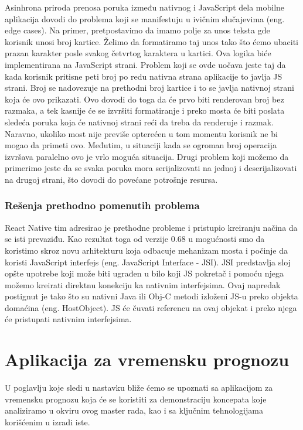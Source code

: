 \documentclass[12pt,oneside]{memoir}
\begin{document}
Asinhrona priroda prenosa poruka između nativnog i JavaScript dela mobilne aplikacija dovodi do problema koji se manifestuju u ivičnim slučajevima (eng. edge cases). Na primer, pretpostavimo da imamo polje za unos teksta gde korisnik unosi broj kartice. Želimo da formatiramo taj unos tako što ćemo ubaciti prazan karakter posle svakog četvrtog karaktera u kartici. Ova logika biće implementirana na JavaScript strani. Problem koji se ovde uočava jeste taj da kada korisnik pritisne peti broj po redu nativna strana aplikacije to javlja JS strani. Broj se nadovezuje na prethodni broj kartice i to se javlja nativnoj strani koja će ovo prikazati. Ovo dovodi do toga da će prvo biti renderovan broj bez razmaka, a tek kasnije će se izvršiti formatiranje i preko mosta će biti poslata sledeća poruka koja će nativnoj strani reći da treba da renderuje i razmak. Naravno, ukoliko most nije previše opterećen u tom momentu korisnik ne bi mogao da primeti ovo. Međutim, u situaciji kada se ogroman broj operacija izvršava paralelno ovo je vrlo moguća situacija. Drugi problem koji možemo da primerimo jeste da se svaka poruka mora serijalizovati na jednoj i deserijalizovati na drugoj strani, što dovodi do povećane potrošnje resursa.

\subsection{Rešenja prethodno pomenutih problema}

React Native tim adresirao je prethodne probleme i pristupio kreiranju načina da se isti prevaziđu. Kao rezultat toga od verzije 0.68 u mogućnosti smo da koristimo skroz novu arhitekturu koja odbacuje mehanizam mosta i počinje da koristi JavaScript interfejs (eng. JavaScript Interface - JSI). JSI predstavlja sloj opšte upotrebe koji može biti ugrađen u bilo koji JS pokretač i pomoću njega možemo kreirati direktnu konekciju ka nativnim interfejsima. Ovaj napredak postignut je tako što su nativni Java ili Obj-C metodi izloženi JS-u preko objekta domaćina (eng. HostObject). JS će čuvati referencu na ovaj objekat i preko njega će pristupati nativnim interfejsima.

\chapter{Aplikacija za vremensku prognozu}

U poglavlju koje sledi u nastavku bliže ćemo se upoznati sa aplikacijom za vremensku prognozu koja će se koristiti za demonstraciju koncepata koje analiziramo u okviru ovog master rada, kao i sa ključnim tehnologijama korišćenim u izradi iste.
\end{document}
